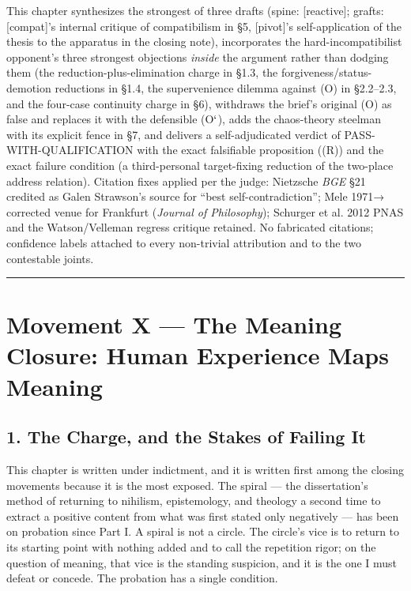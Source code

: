 \documentclass[11pt]{article}
\begin{document}
This chapter synthesizes the strongest of three drafts (spine: [reactive]; grafts: [compat]'s internal critique of compatibilism in §5, [pivot]'s self-application of the thesis to the apparatus in the closing note), incorporates the hard-incompatibilist opponent's three strongest objections \emph{inside} the argument rather than dodging them (the reduction-plus-elimination charge in §1.3, the forgiveness/\allowbreak{}status-demotion reductions in §1.4, the supervenience dilemma against (O) in §2.2–2.3, and the four-case continuity charge in §6), withdraws the brief's original (O) as false and replaces it with the defensible (O\ensuremath{`}), adds the chaos-theory steelman with its explicit fence in §7, and delivers a self-adjudicated verdict of PASS-WITH-QUALIFICATION with the exact falsifiable proposition ((R)) and the exact failure condition (a third-personal target-fixing reduction of the two-place address relation). Citation fixes applied per the judge: Nietzsche \emph{BGE} §21 credited as Galen Strawson's source for ``best self-contradiction''; Mele 1971→ corrected venue for Frankfurt (\emph{Journal of Philosophy}); Schurger et al. 2012 PNAS and the Watson/\allowbreak{}Velleman regress critique retained. No fabricated citations; confidence labels attached to every non-trivial attribution and to the two contestable joints.

\medskip\noindent\rule{\linewidth}{0.3pt}\medskip

\section*{Movement X — The Meaning Closure: Human Experience Maps Meaning}

\subsection*{1. The Charge, and the Stakes of Failing It}

This chapter is written under indictment, and it is written first among the closing movements because it is the most exposed. The spiral — the dissertation's method of returning to nihilism, epistemology, and theology a second time to extract a positive content from what was first stated only negatively — has been on probation since Part I. A spiral is not a circle. The circle's vice is to return to its starting point with nothing added and to call the repetition rigor; on the question of meaning, that vice is the standing suspicion, and it is the one I must defeat or concede. The probation has a single condition.
\end{document}
